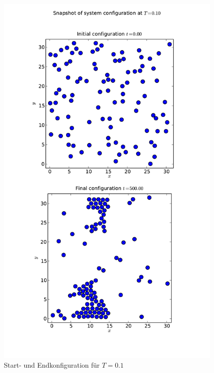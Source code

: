 \documentclass[11pt,a4paper]{article}
\begin{document}
\begin{figure}[tbp]
\centering
\vspace*{-1cm}\includegraphics[width=14cm]{../snapshot_T_0_10}
\vspace*{-1.5cm} \caption{Start- und Endkonfiguration für $T=0.1$}\label{fig:config01}
\end{figure}
\end{document}

